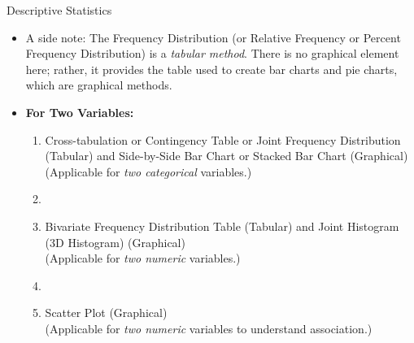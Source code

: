 \documentclass[8pt, usepdftitle=false]{beamer}
\begin{document}
\begin{frame}[allowframebreaks]{Descriptive Statistics}
\begin{itemize}
{\begin{itemize}
  \medskip
  \item A side note: The Frequency Distribution (or Relative Frequency or Percent Frequency Distribution) is a \emph{tabular method}. There is no graphical element here; rather, it provides the table used to create bar charts and pie charts, which are graphical methods.
  
\framebreak

  \medskip
  \item \textbf{For Two Variables:}
  \medskip
  \begin{enumerate}
    \normalsize
      \item \alert{Cross-tabulation or Contingency Table or Joint Frequency Distribution (Tabular)} and \alert{Side-by-Side Bar Chart or Stacked Bar Chart (Graphical)}\\
            (Applicable for \emph{two categorical} variables.)
      \item[]
      \item \alert{Bivariate Frequency Distribution Table (Tabular)} and \alert{Joint Histogram (3D Histogram) (Graphical)}\\
            (Applicable for \emph{two numeric} variables.)
      \item[]
      \item \alert{Scatter Plot (Graphical)}\\
            (Applicable for \emph{two numeric} variables to understand association.)
  \end{enumerate}

\end{itemize}
}










\end{itemize}
\end{frame}
\end{document}
